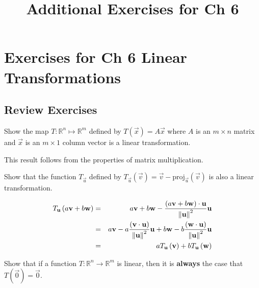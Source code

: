 \documentclass{ximera}
\title{Additional Exercises for Ch 6} \license{CC BY-NC-SA 4.0}
\begin{document}
\begin{abstract}
\end{abstract}
\maketitle

\section*{Exercises for Ch 6 Linear Transformations}

\subsection*{Review Exercises}

\begin{problem}\label{prb:6.1} Show the map $T:\mathbb{R}^{n}\mapsto \mathbb{R}^{m}$ defined by
$T\left( \vec{x} \right) =A\vec{x}$ where $A$ is an $m\times n$ matrix
and $\vec{x}$ is an $m\times 1$ column vector is a linear transformation.
\begin{hint}
This result follows from the properties of matrix multiplication.
\end{hint}
\end{problem}

\begin{problem}\label{prb:6.2} Show that the function $T_{\vec{u}}$ defined by $T_{\vec{u}}
\left( \vec{v}\right) = \vec{v}-\mbox{proj}_{\vec{u}}\left(
\vec{v}\right) $ is also a linear transformation.
\begin{hint}
\begin{eqnarray*}
T_{\mathbf{u}}\left( a\mathbf{v}+b\mathbf{w}\right) &=&a\mathbf{v}+b\mathbf{w}-\frac{\left( a\mathbf{v}+b\mathbf{w}\right)\cdot \mathbf{u} }{\left\lVert \mathbf{u}
\right\rVert ^{2}}\mathbf{u} \\
&=&a\mathbf{v}-a\frac{\left( \mathbf{v}\cdot \mathbf{u}\right) }{\left\lVert \mathbf{u} \right\rVert ^{2}}\mathbf{u}+b\mathbf{w}-b\frac{\left( \mathbf{w}\cdot \mathbf{u}
\right) }{\left\lVert \mathbf{u}\right\rVert ^{2}}\mathbf{u} \\
&=&aT_{\mathbf{u}}\left( \mathbf{v}\right) +bT_{\mathbf{u}}\left( \mathbf{w}
\right)
\end{eqnarray*}
\end{hint}
\end{problem}

\begin{problem}\label{prb:6.4} Show that if a function $T:\mathbb{R}^{n}\rightarrow \mathbb{R}^{m}$
is linear, then it is \textbf{always }the case that $T\left(\vec{0}\right) = \vec{0}$.
\end{problem}
\end{document}
